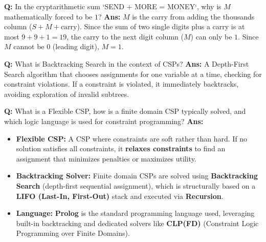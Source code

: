 \documentclass[10pt,a4paper,twocolumn]{article}
\begin{document}
\begin{tcolorbox}[
  colback=white,
  colframe=UnitColorFive,
  colbacktitle=gray!10!white,
  coltitle=black,
  fonttitle=\bfseries\sffamily\small,
  title={Unit V $\bullet$ Card 5: M = 1 Deduction},
  boxrule=1.2pt,
  arc=2mm,
  outer arc=2mm,
  boxsep=1.5mm,
  top=1mm,
  bottom=1mm,
  left=1.5mm,
  right=1.5mm,
  before skip=2.5mm,
  after skip=2.5mm
]
\textbf{Q:} In the cryptarithmetic sum `SEND + MORE = MONEY`, why is $M$ mathematically forced to be $1$?
\tcbline
\textbf{Ans:} $M$ is the carry from adding the thousands column ($S + M + \text{carry}$). Since the sum of two single digits plus a carry is at most $9 + 9 + 1 = 19$, the carry to the next digit column ($M$) can only be $1$. Since $M$ cannot be $0$ (leading digit), $M = 1$.
\end{tcolorbox}


\begin{tcolorbox}[
  colback=white,
  colframe=UnitColorFive,
  colbacktitle=gray!10!white,
  coltitle=black,
  fonttitle=\bfseries\sffamily\small,
  title={Unit V $\bullet$ Card 6: Backtracking Search in CSP},
  boxrule=1.2pt,
  arc=2mm,
  outer arc=2mm,
  boxsep=1.5mm,
  top=1mm,
  bottom=1mm,
  left=1.5mm,
  right=1.5mm,
  before skip=2.5mm,
  after skip=2.5mm
]
\textbf{Q:} What is Backtracking Search in the context of CSPs?
\tcbline
\textbf{Ans:} A Depth-First Search algorithm that chooses assignments for one variable at a time, checking for constraint violations. If a constraint is violated, it immediately backtracks, avoiding exploration of invalid subtrees.
\end{tcolorbox}


\begin{tcolorbox}[
  colback=white,
  colframe=UnitColorFive,
  colbacktitle=gray!10!white,
  coltitle=black,
  fonttitle=\bfseries\sffamily\small,
  title={Unit V $\bullet$ Card 7: Flexible CSPs, Backtracking \& Solver Languages (Q5.3)},
  boxrule=1.2pt,
  arc=2mm,
  outer arc=2mm,
  boxsep=1.5mm,
  top=1mm,
  bottom=1mm,
  left=1.5mm,
  right=1.5mm,
  before skip=2.5mm,
  after skip=2.5mm
]
\textbf{Q:} What is a Flexible CSP, how is a finite domain CSP typically solved, and which logic language is used for constraint programming?
\tcbline
\textbf{Ans:} \begin{itemize}
  \item   \textbf{Flexible CSP:} A CSP where constraints are soft rather than hard. If no solution satisfies all constraints, it \textbf{relaxes constraints} to find an assignment that minimizes penalties or maximizes utility.
  \item   \textbf{Backtracking Solver:} Finite domain CSPs are solved using \textbf{Backtracking Search} (depth-first sequential assignment), which is structurally based on a \textbf{LIFO (Last-In, First-Out)} stack and executed via \textbf{Recursion}.
  \item   \textbf{Language:} \textbf{Prolog} is the standard programming language used, leveraging built-in backtracking and dedicated solvers like \textbf{CLP(FD)} (Constraint Logic Programming over Finite Domains).
\end{itemize}
\end{tcolorbox}
\end{document}
